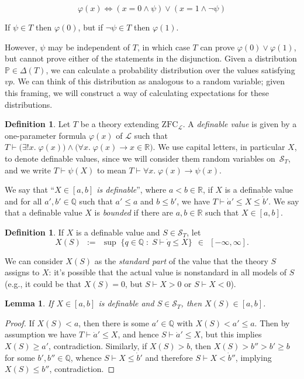 \documentclass[12pt]{article}
\newcommand{\PP}{\mathbb{P}}
\newcommand{\vp}{\varphi}
\newcommand{\RR}{\mathbb{R}}
\newcommand{\QQ}{\mathbb{Q}}
\newcommand{\zfc}{\mathrm{ZFC}}
\newcommand{\zfcl}{{\zfc_\cL}}
\newcommand{\cL}{\mathcal{L}}
\newcommand{\cS}{\mathcal{S}}
\newcommand{\inClosed}[1]{#1 \in [a, b]}
\theoremstyle{plain}
\newtheorem{lemma}[theorem]{Lemma}
\theoremstyle{definition}
\newtheorem{definition}[theorem]{Definition}
\theoremstyle{remark}
\begin{document}
$$\vp(x) \iff (x = 0 \wedge \psi) \vee (x = 1 \wedge \neg \psi)$$

If $\psi\in T$ then $\vp(0)$, but if $\neg \psi\in T$ then $\vp(1)$.

However, $\psi$ may be independent of $T$, in which case $T$ can prove $\vp(0)\vee\vp(1)$, but cannot prove either of the statements in the disjunction. Given a distribution $\PP\in \Delta(T)$, we can calculate a probability distribution over the values satisfying $vp$. We can think of this distribution as analogous to a random variable; given this framing, we will construct a way of calculating expectations for these distributions.

\begin{definition}
Let $T$ be a theory extending $\zfcl$. 
A \emph{definable value} is given by a one-parameter formula $\vp(x)$ of $\cL$ such that $T\vdash\big(\exists!x.\;\vp(x)\big)\wedge\big(\forall x.\;\vp(x)\to x\in\RR\big)$. We use capital letters, in particular $X$, to denote definable values, since we will consider them random variables on~$\cS_T$, and we write $T\vdash\psi(X)$ to mean $T\vdash\forall x.\;\vp(x)\to\psi(x)$.

We say that ``\emph{$X\in[a,b]$ is definable}'', where $a<b\in\RR$, if $X$ is a definable value and for all $a',b'\in\QQ$ such that $a'\le a$ and $b\le b'$, we have $T\vdash\dot a'\le X\le \dot b'$.
We say that a definable value $X$ is \emph{bounded} if there are $a,b\in\RR$ such that $\inClosed{X}$.
\end{definition}
\begin{definition}
If $X$ is a definable value and $S\in\cS_T$, let
\[X(S) \;\,:=\;\, \sup\;\{q\in\QQ \;:\; S\vdash \dot q \le X\} \;\,\in\;\, [-\infty,\infty].\]
\end{definition}
We can consider $X(S)$ as the \emph{standard part} of the value that the theory $S$ assigns to $X$: it's possible that the actual value is nonstandard in all models of $S$ (e.g., it could be that $X(S) = 0$, but $S\vdash X>0$ or $S\vdash X<0$).
\begin{lemma}
If $X\in[a,b]$ is definable and $S\in\cS_T$, then $X(S)\in[a,b]$.
\end{lemma}
\begin{proof}
If $X(S) < a$, then there is some $a'\in\QQ$ with $X(S) < a' \le a$. Then by assumption we have $T\vdash\dot a'\le X$, and hence $S\vdash\dot a'\le X$, but this implies $X(S)\ge a'$, contradiction. Similarly, if $X(S) > b$, then $X(S) > b'' > b' \ge b$ for some $b',b''\in\QQ$, whence $S\vdash X\le\dot b'$ and therefore $S\vdash X<\dot b''$, implying $X(S) \le b''$, contradiction.
\end{proof}
\end{document}
